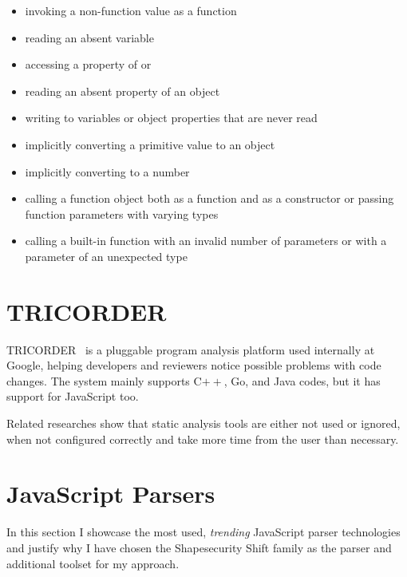 \begin{itemize}[topsep=0pt]
  \item invoking a non-function value as a function
  \item reading an absent variable
  \item accessing a property of  or 
  \item reading an absent property of an object
  \item writing to variables or object properties that are never read
  \item implicitly converting a primitive value to an object
  \item implicitly converting  to a number
  \item calling a function object both as a function and as a constructor or passing function parameters with varying types
  \item calling a built-in function with an invalid number of parameters or with a parameter of an unexpected type
\end{itemize}


\section{TRICORDER}
TRICORDER~\cite{tricorder} is a pluggable program analysis platform used internally at Google, helping developers and reviewers notice possible problems with code changes. The system mainly supports C$++$, Go, and Java codes, but it has support for JavaScript too.

Related researches show that static analysis tools are either not used or ignored, when not configured correctly and take more time from the user than necessary. 


\section{JavaScript Parsers}
\label{sect:javascript-parsers}
In this section I showcase the most used, \emph{trending} JavaScript parser technologies and justify why I have chosen the Shapesecurity Shift family as the parser and additional toolset for my approach.

